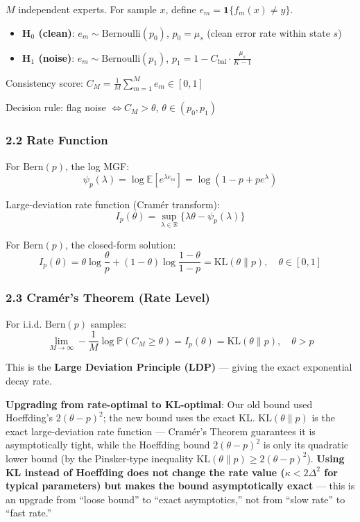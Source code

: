 \documentclass[
  12pt,
]{ctexart}
\providecommand{\tightlist}{%
  \setlength{\itemsep}{0pt}\setlength{\parskip}{0pt}}
\begin{document}
\(M\) independent experts. For sample \(x\), define \(e_m = \mathbf{1}\{f_m(x) \neq y\}\).

\begin{itemize}
\tightlist
\item
  \textbf{H\(_0\) (clean)}: \(e_m \sim \text{Bernoulli}(p_0)\), \(p_0 = \mu_s\) (clean error rate within state \(s\))
\item
  \textbf{H\(_1\) (noise)}: \(e_m \sim \text{Bernoulli}(p_1)\), \(p_1 = 1 - C_{\text{bal}} \cdot \frac{\mu_s}{K-1}\)
\end{itemize}

Consistency score: \(C_M = \frac{1}{M}\sum_{m=1}^M e_m \in [0,1]\)

Decision rule: flag noise \(\iff C_M > \theta\), \(\theta \in (p_0, p_1)\)

\subsubsection{2.2 Rate Function}\label{rate-function}

For \(\text{Bern}(p)\), the log MGF:
\[\psi_p(\lambda) = \log \mathbb{E}[e^{\lambda e_m}] = \log(1 - p + pe^\lambda)\]

Large-deviation rate function (Cramér transform):
\[I_p(\theta) = \sup_{\lambda \in \mathbb{R}} \{\lambda\theta - \psi_p(\lambda)\}\]

For \(\text{Bern}(p)\), the closed-form solution:
\[I_p(\theta) = \theta \log\frac{\theta}{p} + (1-\theta)\log\frac{1-\theta}{1-p} = \text{KL}(\theta \| p), \quad \theta \in [0,1]\]

\subsubsection{2.3 Cramér's Theorem (Rate Level)}\label{cramer-theorem-rate-level}

For i.i.d. \(\text{Bern}(p)\) samples:
\[\lim_{M\to\infty} -\frac{1}{M}\log \mathbb{P}(C_M \geq \theta) = I_p(\theta) = \text{KL}(\theta \| p), \quad \theta > p\]

This is the \textbf{Large Deviation Principle (LDP)} --- giving the exact exponential decay rate.

\textbf{Upgrading from rate-optimal to KL-optimal}: Our old bound used Hoeffding's \(2(\theta-p)^2\); the new bound uses the exact KL. \(\text{KL}(\theta\|p)\) is the exact large-deviation rate function --- Cramér's Theorem guarantees it is asymptotically tight, while the Hoeffding bound \(2(\theta-p)^2\) is only its quadratic lower bound (by the Pinsker-type inequality \(\text{KL}(\theta\|p) \geq 2(\theta-p)^2\)). \textbf{Using KL instead of Hoeffding does not change the rate value (\(\kappa < 2\Delta^2\) for typical parameters) but makes the bound asymptotically exact} --- this is an upgrade from ``loose bound'' to ``exact asymptotics,'' not from ``slow rate'' to ``fast rate.''
\end{document}
